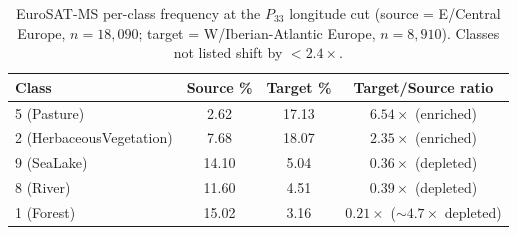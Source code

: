 \documentclass[11pt]{article}
\begin{document}
\begin{table}[h]\centering\small
\caption{EuroSAT-MS per-class frequency at the $P_{33}$ longitude cut (source = E/Central Europe,
$n{=}18{,}090$; target = W/Iberian-Atlantic Europe, $n{=}8{,}910$). Classes not listed shift by
${<}2.4\times$.}\label{tab:classprior}
\begin{tabular}{lccc}
\toprule
Class & Source \% & Target \% & Target/Source ratio \\
\midrule
5 (Pasture) & 2.62 & 17.13 & $6.54\times$ (enriched) \\
2 (HerbaceousVegetation) & 7.68 & 18.07 & $2.35\times$ (enriched) \\
9 (SeaLake) & 14.10 & 5.04 & $0.36\times$ (depleted) \\
8 (River) & 11.60 & 4.51 & $0.39\times$ (depleted) \\
1 (Forest) & 15.02 & 3.16 & $0.21\times$ ($\sim\!4.7\times$ depleted) \\
\bottomrule
\end{tabular}
\end{table}
\end{document}
